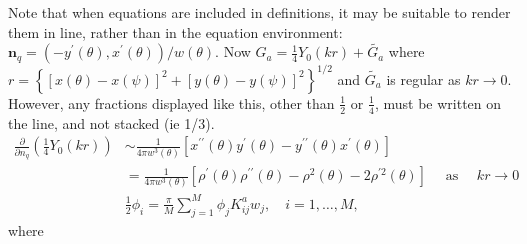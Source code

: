 \documentclass[12pt,a4paper]{article}
\begin{document}
Note that when equations are included in definitions, it may be suitable to render them in line, rather than in the equation environment: \(\boldsymbol{n}_{q}=\left(-y^{\prime}(\theta), x^{\prime}(\theta)\right) / w(\theta)\). Now \(G_{a}=\frac{1}{4} Y_{0}(k r)+\widetilde{G_{a}}\) where \(r=\left\{[x(\theta)-x(\psi)]^{2}+[y(\theta)-y(\psi)]^{2}\right\}^{1 / 2}\) and \(\widetilde{G_{a}}\) is regular as \(k r \rightarrow 0\). However, any fractions displayed like this, other than \(\frac{1}{2}\) or \(\frac{1}{4}\), must be written on the line, and not stacked (ie 1/3).
\[
\begin{aligned}
\frac{\partial}{\partial n_{q}}\left(\frac{1}{4} Y_{0}(k r)\right) & \sim \frac{1}{4 \pi w^{3}(\theta)}\left[x^{\prime \prime}(\theta) y^{\prime}(\theta)-y^{\prime \prime}(\theta) x^{\prime}(\theta)\right] \\
& =\frac{1}{4 \pi w^{3}(\theta)}\left[\rho^{\prime}(\theta) \rho^{\prime \prime}(\theta)-\rho^{2}(\theta)-2 \rho^{\prime 2}(\theta)\right] \quad \text { as } \quad k r \rightarrow 0 \\
& \frac{1}{2} \phi_{i}=\frac{\pi}{M} \sum_{j=1}^{M} \phi_{j} K_{i j}^{a} w_{j}, \quad i=1, \ldots, M,
\end{aligned}
\]
where
\end{document}
